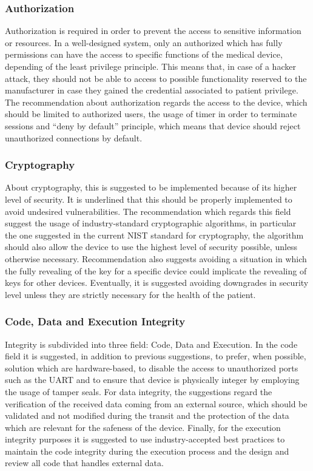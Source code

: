 \documentclass{Configuration_Files/PoliMi3i_thesis}
\begin{document}
\subsubsection{Authorization} 
Authorization is required in order to prevent the access to sensitive information or resources. In a well-designed system, only an authorized which has fully permissions can have the access to specific functions of the medical device, depending of the least privilege principle. This means that, in case of a hacker attack, they should not be able to access to possible functionality reserved to the manufacturer in case they gained the credential associated to patient privilege.
The recommendation about authorization regards the access to the device, which should be limited to authorized users, the usage of timer in order to terminate sessions and “deny by default” principle, which means that device should reject unauthorized connections by default.
\subsubsection{Cryptography} 
About cryptography, this is suggested to be implemented because of its higher level of security. It is underlined that this should be properly implemented to avoid undesired vulnerabilities.
The recommendation which regards this field suggest the usage of industry-standard cryptographic algorithms, in particular the one suggested in the current NIST standard for cryptography, the algorithm should also allow the device to use the highest level of security possible, unless otherwise necessary. Recommendation also suggests avoiding a situation in which the fully revealing of the key for a specific device could implicate the revealing of keys for other devices. Eventually, it is suggested avoiding downgrades in security level unless they are strictly necessary for the health of the patient.
\subsubsection{Code, Data and Execution Integrity } 
Integrity is subdivided into three field: Code, Data and Execution. 
In the code field it is suggested, in addition to previous suggestions, to prefer, when possible, solution which are hardware-based, to disable the access to unauthorized ports such as the UART and to ensure that device is physically integer by employing the usage of tamper seals.
For data integrity, the suggestions regard the verification of the received data coming from an external source, which should be validated and not modified during the transit and the protection of the data which are relevant for the safeness of the device. 
Finally, for the execution integrity purposes it is suggested to use industry-accepted best practices to maintain the code integrity during the execution process and the design and review all code that handles external data.
\end{document}
